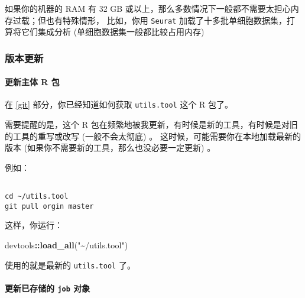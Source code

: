 \documentclass[
]{article}
\newenvironment{Shaded}{\begin{snugshade}}{\end{snugshade}}
\newcommand{\KeywordTok}[1]{\textcolor[rgb]{0.13,0.29,0.53}{\textbf{#1}}}
\newcommand{\NormalTok}[1]{#1}
\newcommand{\OperatorTok}[1]{\textcolor[rgb]{0.81,0.36,0.00}{\textbf{#1}}}
\newcommand{\StringTok}[1]{\textcolor[rgb]{0.31,0.60,0.02}{#1}}
\begin{document}
如果你的机器的 RAM 有 32 GB 或以上，那么多数情况下一般都不需要太担心内存过载；但也有特殊情形，
比如，你用 \texttt{Seurat} 加载了十多批单细胞数据集，打算将它们集成分析 (单细胞数据集一般都比较占用内存)

\hypertarget{ux7248ux672cux66f4ux65b0}{%
\subsubsection{版本更新}\label{ux7248ux672cux66f4ux65b0}}

\hypertarget{ux66f4ux65b0ux4e3bux4f53-r-ux5305}{%
\paragraph{更新主体 R 包}\label{ux66f4ux65b0ux4e3bux4f53-r-ux5305}}

在 \ref{git} 部分，你已经知道如何获取 \texttt{utils.tool} 这个 R 包了。

需要提醒的是，这个 R 包在频繁地被我更新，有时候是新的工具，有时候是对旧的工具的重写或改写 (一般不会太彻底) 。
这时候，可能需要你在本地加载最新的版本 (如果你不需要新的工具，那么也没必要一定更新) 。

例如：

\begin{tcolorbox}[colback = gray!10, colframe = red!50, width = 16cm, arc = 1mm, auto outer arc, title = {Bash input}]
\begin{verbatim}

cd ~/utils.tool
git pull orgin master

\end{verbatim}
\end{tcolorbox}

这样，你运行：

\begin{Shaded}
\begin{Highlighting}[]
\NormalTok{devtools}\OperatorTok{::}\KeywordTok{load\_all}\NormalTok{(}\StringTok{"\textasciitilde{}/utils.tool"}\NormalTok{)}
\end{Highlighting}
\end{Shaded}

使用的就是最新的 \texttt{utils.tool} 了。

\hypertarget{ux66f4ux65b0ux5df2ux5b58ux50a8ux7684-job-ux5bf9ux8c61}{%
\paragraph{\texorpdfstring{更新已存储的 \texttt{job} 对象}{更新已存储的 job 对象}}\label{ux66f4ux65b0ux5df2ux5b58ux50a8ux7684-job-ux5bf9ux8c61}}
\end{document}

